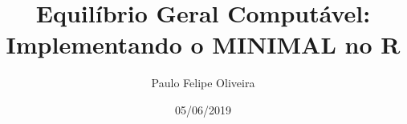 \renewcommand{\baselinestretch}{1}

\usepackage[T1]{fontenc}
\usepackage{fbb}


\makeatletter
\def\@maketitle{%
  \newpage
  \thispagestyle{empty}
  \null
  \vskip 1em%
  \begin{center}%
  \let \footnote \thanks
  {\Huge \@title \par}%
    \vskip 1.5em%
    {\large
      \lineskip .2em%
      \@author}%
    \vskip 1em%
  \end{center}%
  \par
  \vskip 1.5em}
\makeatother


\usepackage{fontawesome}

\usepackage{titling}

\setlength{\droptitle}{-2em}

  \title{Equilíbrio Geral Computável: Implementando o MINIMAL no R}
    \pretitle{\vspace{\droptitle}\centering\huge}
  \posttitle{\par}
    \author{Paulo Felipe Oliveira}
    \preauthor{\centering\large\emph}
  \postauthor{\par}
      \predate{\centering\large\emph}
  \postdate{\par}
    \date{05/06/2019}


\let\oldShaded\Shaded
\let\endoldShaded\endShaded
\renewenvironment{Shaded}{\footnotesize\oldShaded}{\endoldShaded}

\let\oldverbatim\verbatim
\let\endoldverbatim\endverbatim
\renewenvironment{verbatim}{\footnotesize\oldverbatim}{\endoldverbatim}

\usepackage{booktabs}
\setlength\heavyrulewidth{0.1ex}